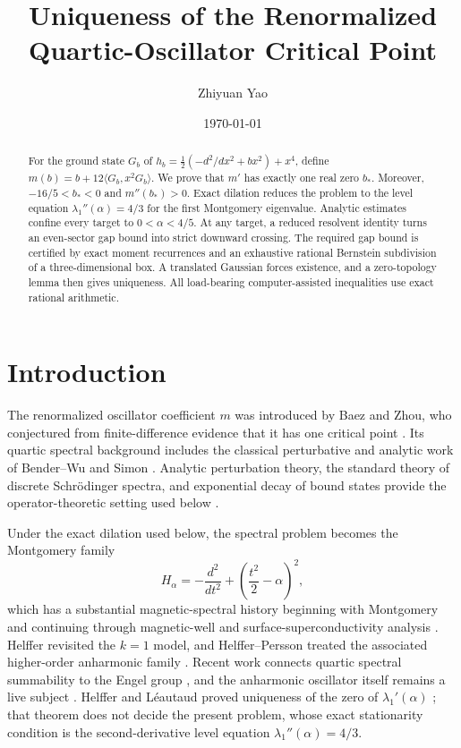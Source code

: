 \documentclass[11pt,reqno]{amsart}
\title{Uniqueness of the Renormalized Quartic-Oscillator Critical Point}
\author{Zhiyuan Yao}
\date{\today}
\theoremstyle{plain}
\theoremstyle{definition}
\theoremstyle{remark}
\numberwithin{equation}{section}
\begin{document}
\begin{abstract}
For the ground state $G_b$ of
$h_b=\tfrac12(-d^2/dx^2+bx^2)+x^4$, define
$m(b)=b+12\langle G_b,x^2G_b\rangle$.  We prove that $m'$ has exactly one
real zero $b_*$.  Moreover, $-16/5<b_*<0$ and $m''(b_*)>0$.  Exact dilation
reduces the problem to the level equation
$\lambda_1''(\alpha)=4/3$ for the first Montgomery eigenvalue.  Analytic
estimates confine every target to $0<\alpha<4/5$.  At any target, a reduced
resolvent identity turns an even-sector gap bound into strict downward
crossing.  The required gap bound is certified by exact moment recurrences
and an exhaustive rational Bernstein subdivision of a three-dimensional
box.  A translated Gaussian forces existence, and a zero-topology lemma
then gives uniqueness.  All load-bearing computer-assisted inequalities use
exact rational arithmetic.
\end{abstract}

\maketitle

\section{Introduction}

The renormalized oscillator coefficient $m$ was introduced by Baez and Zhou,
who conjectured from finite-difference evidence that it has one critical
point \cite{Baez_1992ro}.  Its quartic spectral background includes the
classical perturbative and analytic work of Bender--Wu and Simon
\cite{Bender_1969ao,Simon_1970ca}.  Analytic perturbation theory, the
standard theory of discrete Schr\"odinger spectra, and exponential decay of
bound states provide the operator-theoretic setting used below
\cite{Kato_Book,ReedSimonIV,Agmon_Book}.

Under the exact dilation used below, the spectral problem becomes the
Montgomery family
\[
H_\alpha=-\frac{d^2}{dt^2}+\left(\frac{t^2}{2}-\alpha\right)^2,
\]
which has a substantial magnetic-spectral history beginning with Montgomery
and continuing through magnetic-well and surface-superconductivity analysis
\cite{Montgomery_1995ht,Helffer_1996sa,Pan_2002so,HELFFER_2004mb,Fournais_Book}.
Helffer revisited the $k=1$ model, and Helffer--Persson treated the associated
higher-order anharmonic family \cite{Helffer_2010tm,Helffer_2010sp}.
Recent work connects quartic spectral summability to the Engel group
\cite{Bahouri_2023ss}, and the anharmonic oscillator itself remains a live
subject \cite{Turbiner_2021ao}.  Helffer and Léautaud proved uniqueness of the zero
of $\lambda_1'(\alpha)$ \cite{Helffer_2024oc}; that theorem does not decide
the present problem, whose exact stationarity condition is the
second-derivative level equation $\lambda_1''(\alpha)=4/3$.
\end{document}
